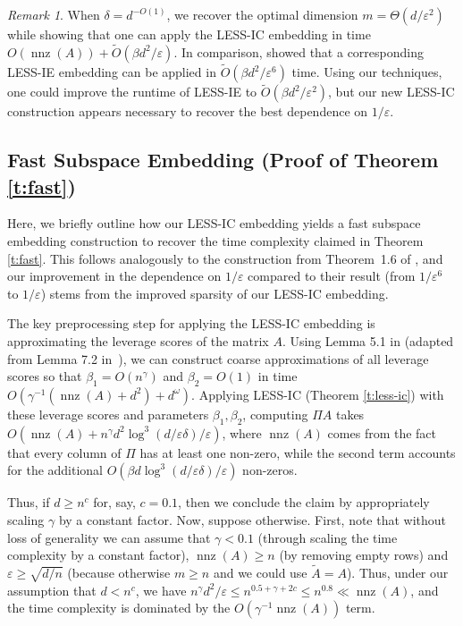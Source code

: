 \documentclass[11pt]{amsart}
\numberwithin{equation}{section}
\numberwithin{equation}{section}
\DeclareMathOperator{\nnz}{nnz}
\theoremstyle{remark}
\newtheorem{remark}[theorem]{Remark}
\theoremstyle{definition}
\begin{document}
\begin{remark}
    When $\delta = d^{-O(1)}$, we recover the optimal dimension $m=\Theta(d/\varepsilon^2)$ while showing that one can apply the LESS-IC embedding in time $O(\nnz(A)) + \tilde O(\beta d^2/\varepsilon)$. In comparison, \cite{chenakkod2024optimal} showed that a corresponding LESS-IE embedding can be applied in $\tilde O(\beta d^2/\varepsilon^6)$ time. Using our techniques, one could improve the runtime of LESS-IE to $\tilde O(\beta d^2/\varepsilon^2)$, but our new LESS-IC construction appears necessary to recover the best dependence on $1/\varepsilon$.
\end{remark}

\subsection{Fast Subspace Embedding (Proof of Theorem \ref{t:fast})}

Here, we briefly outline how our LESS-IC embedding yields a fast subspace embedding construction to recover the time complexity claimed in Theorem \ref{t:fast}. This follows analogously to the construction from Theorem~1.6 of \cite{chenakkod2024optimal}, and our improvement in the dependence on $1/\varepsilon$ compared to their result (from $1/\varepsilon^6$ to $1/\varepsilon$) stems from the improved sparsity of our LESS-IC embedding. 

The key preprocessing step for applying the LESS-IC embedding is approximating the leverage scores of the matrix $A$. Using Lemma 5.1 in \cite{chenakkod2024optimal} (adapted from Lemma 7.2 in~\cite{chepurko2022near}), we can construct coarse approximations of all leverage scores so that $\beta_1=O(n^\gamma)$ and $\beta_2=O(1)$ in time $O(\gamma^{-1}(\nnz(A)+d^2) + d^\omega)$. Applying LESS-IC (Theorem \ref{t:less-ic}) with these leverage scores and parameters $\beta_1,\beta_2$, computing $\Pi A$ takes $O(\nnz(A) + n^{\gamma} d^2\log^{3}(d/\varepsilon\delta)/\varepsilon)$, where $\nnz(A)$ comes from the fact that every column  of $\Pi$ has at least one non-zero, while the second term accounts for the additional $O(\beta d\log^{3}(d/\varepsilon\delta)/\varepsilon)$ non-zeros. 

Thus, if $d\geq n^c$ for, say, $c=0.1$, then we conclude the claim by appropriately scaling $\gamma$ by a constant factor. Now, suppose otherwise. First, note that without loss of generality we can assume that $\gamma<0.1$ (through scaling the time complexity by a constant factor), $\nnz(A)\geq n$ (by removing empty rows) and $\varepsilon\geq \sqrt{d/n}$ (because otherwise $m\geq n$ and we could use $\tilde A= A$). Thus, under our assumption that $d<n^c$, we have $n^{\gamma} d^2/\varepsilon \leq n^{0.5+\gamma+2c}\leq n^{0.8} \ll \nnz(A)$, and the time complexity is dominated by the $O(\gamma^{-1}\nnz(A))$ term.
\end{document}
